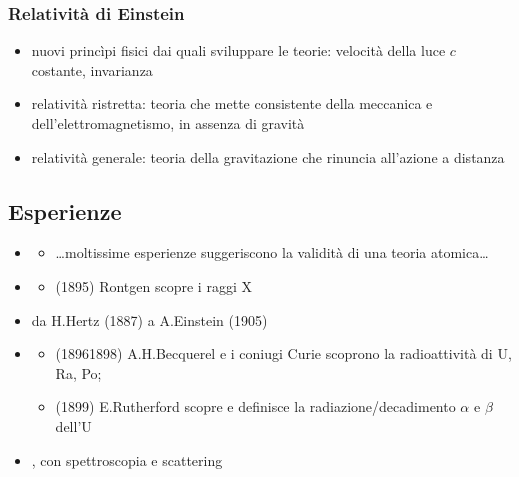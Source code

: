\documentclass[letterpaper,10pt,italian]{jupyterBook}
\begin{document}
\subsubsection{Relatività di Einstein}
\label{\detokenize{ch/modern:relativita-di-einstein}}\begin{itemize}
\item {} 
\sphinxAtStartPar
nuovi princìpi fisici dai quali sviluppare le teorie: velocità della luce \(c\) costante, invarianza

\item {} 
\sphinxAtStartPar
relatività ristretta: teoria che mette consistente della meccanica e dell’elettromagnetismo, in assenza di gravità

\item {} 
\sphinxAtStartPar
relatività generale: teoria della gravitazione che rinuncia all’azione a distanza

\end{itemize}


\subsection{Esperienze}
\label{\detokenize{ch/modern:esperienze}}\begin{itemize}
\item {} 
\sphinxAtStartPar
{}
\begin{itemize}
\item {} 
\sphinxAtStartPar
…moltissime esperienze suggeriscono la validità di una teoria atomica…

\end{itemize}

\item {} 
\sphinxAtStartPar
{}
\begin{itemize}
\item {} 
\sphinxAtStartPar
(1895) Rontgen scopre i raggi X

\end{itemize}

\item {} 
\sphinxAtStartPar
{} da H.Hertz (1887) a A.Einstein (1905)

\item {} 
\sphinxAtStartPar
{}
\begin{itemize}
\item {} 
\sphinxAtStartPar
(1896\sphinxhyphen{}1898) A.H.Becquerel e i coniugi Curie scoprono la radioattività di U, Ra, Po;

\item {} 
\sphinxAtStartPar
(1899) E.Rutherford scopre e definisce la radiazione/decadimento \(\alpha\) e \(\beta\) dell’U

\end{itemize}

\item {} 
\sphinxAtStartPar
{}, con spettroscopia e scattering

\end{itemize}
\end{document}
